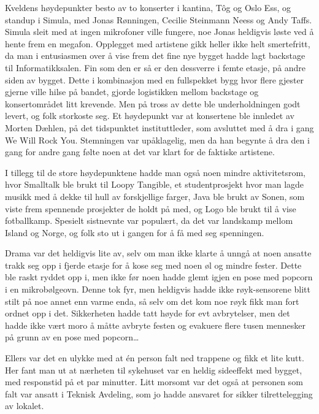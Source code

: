 Kveldens høydepunkter besto av to konserter i kantina, Tôg og Oslo Ess, og standup i Simula, med Jonas Rønningen, Cecilie Steinmann Neess og Andy Taffs. Simula sleit med at ingen mikrofoner ville fungere, noe Jonas heldigvis løste ved å hente frem en megafon. Opplegget med artistene gikk heller ikke helt smertefritt, da man i entusiasmen over å vise frem det fine nye bygget hadde lagt backstage til Informatikksalen. Fin som den er så er den dessverre i femte etasje, på andre siden av bygget. Dette i kombinasjon med en fullspekket bygg hvor flere gjester gjerne ville hilse på bandet, gjorde logistikken mellom backstage og konsertområdet litt krevende. Men på tross av dette ble underholdningen godt levert, og folk storkoste seg. Et høydepunkt var at konsertene ble innledet av Morten Dæhlen, på det tidspunktet instituttleder, som avsluttet med å dra i gang We Will Rock You. Stemningen var upåklagelig, men da han begynte å dra den i gang for andre gang følte noen at det var klart for de faktiske artistene.

I tillegg til de store høydepunktene hadde man også noen mindre aktivitetsrom, hvor Smalltalk ble brukt til Loopy Tangible, et studentprosjekt hvor man lagde musikk med å dekke til hull av forskjellige farger, Java ble brukt av Sonen, som viste frem spennende prosjekter de holdt på med, og Logo ble brukt til å vise fotballkamp. Spesielt sistnevnte var populært, da det var landskamp mellom Island og Norge, og folk sto ut i gangen for å få med seg spenningen.

Drama var det heldigvis lite av, selv om man ikke klarte å unngå at noen ansatte trakk seg opp i fjerde etasje for å kose seg med noen øl og mindre fester. Dette ble raskt ryddet opp i, men ikke før noen hadde glemt igjen en pose med popcorn i en mikrobølgeovn. Denne tok fyr, men heldigvis hadde ikke røyk-sensorene blitt stilt på noe annet enn varme enda, så selv om det kom noe røyk fikk man fort ordnet opp i det. Sikkerheten hadde tatt høyde for evt avbrytelser, men det hadde ikke vært moro å måtte avbryte festen og evakuere flere tusen mennesker på grunn av en pose med popcorn…

Ellers var det en ulykke med at én person falt ned trappene og fikk et lite kutt. Her fant man ut at nærheten til sykehuset var en heldig sideeffekt med bygget, med responstid på et par minutter. Litt morsomt var det også at personen som falt var ansatt i Teknisk Avdeling, som jo hadde ansvaret for sikker tilrettelegging av lokalet.


